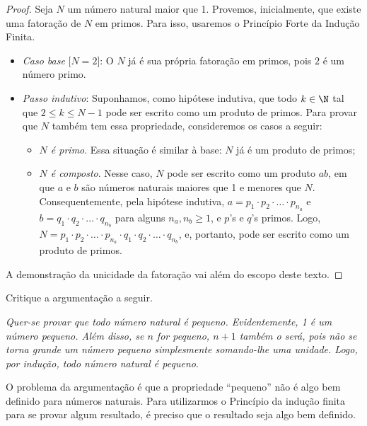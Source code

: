 \begin{proof}
  Seja $N$ um número natural maior que 1. 
  Provemos, inicialmente, que existe uma fatoração de $N$ em primos.
  Para isso, usaremos o Princípio Forte da Indução Finita.

  \begin{itemize}
    \item \emph{Caso base} [$N = 2$]: O $N$ já é sua própria fatoração em primos, pois $2$ é um número primo.
    \item \emph{Passo indutivo}: Suponhamos, como hipótese indutiva, que todo $k \in \N$ tal que $2 \le k \le N-1$ pode ser escrito como um produto de primos.
    Para provar que $N$ também tem essa propriedade, consideremos os casos a seguir:

    \begin{itemize}
      \item \emph{$N$ é primo}. Essa situação é similar à base: $N$ já é um produto de primos;
      \item \emph{$N$ é composto}. Nesse caso, $N$ pode ser escrito como um produto $ab$, em que $a$ e $b$ são números naturais maiores que 1 e menores que $N$.
      Consequentemente, pela hipótese indutiva, $a = p_1 \cdot p_2 \cdot \ldots \cdot p_{n_a}$ e $b = q_1 \cdot q_2 \cdot \ldots \cdot q_{n_b}$ para alguns $n_a, n_b \ge 1$, e $p$'s e $q$'s primos.
      Logo, $N = p_1 \cdot p_2 \cdot \ldots \cdot p_{n_a} \cdot q_1 \cdot q_2 \cdot \ldots \cdot q_{n_b}$, e, portanto, pode ser escrito como um produto de primos.
     \end{itemize}
  \end{itemize}
  
  A demonstração da unicidade da fatoração vai além do escopo deste texto. 

\end{proof}

\begin{example}
Critique a argumentação a seguir.

\textit{Quer-se provar que todo número natural é pequeno. Evidentemente, 1 é um número pequeno. Além disso, se $n$ for pequeno, $n+1$ também o será, pois não se torna grande um número pequeno simplesmente somando-lhe uma unidade. Logo, por indução, todo número natural é pequeno}.

\begin{solution}
O problema da argumentação é que a propriedade ``pequeno'' não é algo bem definido para números naturais. Para utilizarmos o Princípio da indução finita para se provar algum resultado, é preciso que o resultado seja algo bem definido. 
\end{solution}
\end{example}

